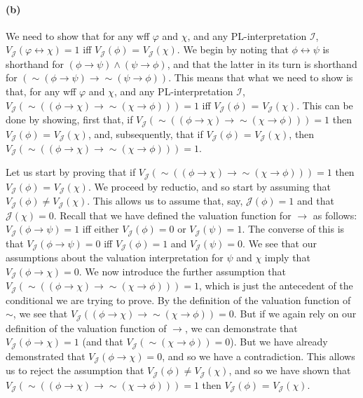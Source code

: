 \documentclass[sloppy, journal, git, bytitle]{humapap}
\begin{document}
\paragraph{(b)} We need to show that for any wff $\varphi$ and $\chi$, and any PL-interpretation $\mathcal{I}$, $V\mathcal{_J}(\varphi\leftrightarrow\chi)=1$ iff $V\mathcal{_J}(\phi)$ = $V\mathcal{_J}(\chi)$. We begin by noting that $\phi\leftrightarrow\psi$ is shorthand for $(\phi\rightarrow\psi)\wedge(\psi\rightarrow\phi)$, and that the latter in its turn is shorthand for $(\sim(\phi\rightarrow\psi)\rightarrow\sim(\psi\rightarrow\phi))$.  
This means that what we need to show is that, for any wff $\varphi$ and $\chi$, and any PL-interpretation $\mathcal{I}$, $V\mathcal{_J}(\sim((\phi\rightarrow\chi)\rightarrow\sim(\chi\rightarrow\phi)))=1$ iff $V\mathcal{_J}(\phi)$ = $V\mathcal{_J}(\chi)$. This can be done by showing, first that, if $V\mathcal{_J}(\sim((\phi\rightarrow\chi)\rightarrow\sim(\chi\rightarrow\phi)))=1$ then $V\mathcal{_J}(\phi)$ = $V\mathcal{_J}(\chi)$, and, subsequently, that if $V\mathcal{_J}(\phi)$ = $V\mathcal{_J}(\chi)$, then $V\mathcal{_J}(\sim((\phi\rightarrow\chi)\rightarrow\sim(\chi\rightarrow\phi)))=1$. 

Let us start by proving that if $V\mathcal{_J}(\sim((\phi\rightarrow\chi)\rightarrow\sim(\chi\rightarrow\phi)))=1$ then $V\mathcal{_J}(\phi)$ = $V\mathcal{_J}(\chi)$. We proceed by reductio, and so start by assuming that $V\mathcal{_J}(\phi) \neq  V\mathcal{_J}(\chi)$. This allows us to assume that, say, $\mathcal{J}(\phi)=1$ and that $\mathcal{J}(\chi)=0$. Recall that we have defined the valuation function for $\rightarrow$ as follows: $V\mathcal{_J}(\phi\rightarrow\psi)=1$ iff either $V\mathcal{_J}(\phi)=0$ or $V\mathcal{_J}(\psi)=1$. The converse of this is that $V\mathcal{_J}(\phi\rightarrow\psi)=0$ iff $V\mathcal{_J}(\phi)=1$ and $V\mathcal{_J}(\psi)=0$. We see that our assumptions about the valuation interpretation for $\psi$ and $\chi$ imply that $V\mathcal{_J}(\phi\rightarrow\chi)=0$. We now introduce the further assumption that $V\mathcal{_J}(\sim((\phi\rightarrow\chi)\rightarrow\sim(\chi\rightarrow\phi)))=1$, which is just the antecedent of the conditional we are trying to prove. By the definition of the valuation function of $\sim$, we see that $V\mathcal{_J}((\phi\rightarrow\chi)\rightarrow\sim(\chi\rightarrow\phi))=0$. But if we again rely on our definition of the valuation function of $\rightarrow$, we can demonstrate that $V\mathcal{_J}(\phi\rightarrow\chi)=1$ (and that $V\mathcal{_J}(\sim(\chi\rightarrow\phi))=0$). But we have already demonstrated that $V\mathcal{_J}(\phi\rightarrow\chi)=0$, and so we have a contradiction. This allows us to reject the assumption that $V\mathcal{_J}(\phi) \neq  V\mathcal{_J}(\chi)$, and so we have shown that $V\mathcal{_J}(\sim((\phi\rightarrow\chi)\rightarrow\sim(\chi\rightarrow\phi)))=1$ then $V\mathcal{_J}(\phi)$ = $V\mathcal{_J}(\chi)$.
\end{document}
